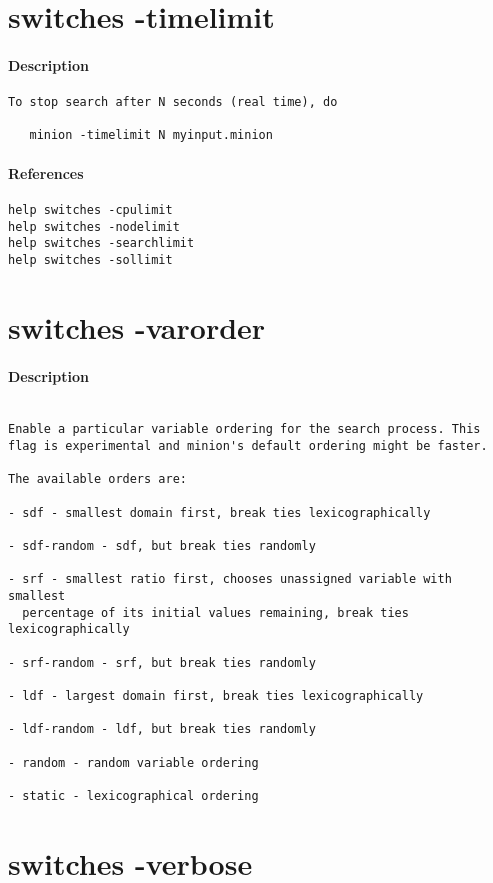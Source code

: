 \section{switches -timelimit}
\paragraph{Description}
{\footnotesize
\begin{verbatim}
To stop search after N seconds (real time), do

   minion -timelimit N myinput.minion
\end{verbatim}
}
\paragraph{References}
{\footnotesize
\begin{verbatim}
help switches -cpulimit
help switches -nodelimit
help switches -searchlimit
help switches -sollimit
\end{verbatim}
}
\section{switches -varorder}
\paragraph{Description}
{\footnotesize
\begin{verbatim}

Enable a particular variable ordering for the search process. This
flag is experimental and minion's default ordering might be faster.

The available orders are:

- sdf - smallest domain first, break ties lexicographically

- sdf-random - sdf, but break ties randomly

- srf - smallest ratio first, chooses unassigned variable with smallest
  percentage of its initial values remaining, break ties lexicographically

- srf-random - srf, but break ties randomly

- ldf - largest domain first, break ties lexicographically

- ldf-random - ldf, but break ties randomly

- random - random variable ordering

- static - lexicographical ordering
\end{verbatim}
}
\section{switches -verbose}
